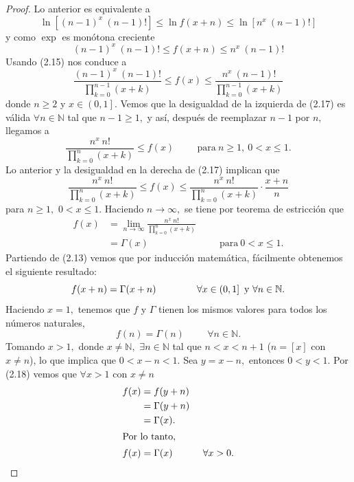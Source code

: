 \begin{proof}
	Lo anterior es equivalente a $$\ln \left[(n-1)^x\ (n-1)!\right] \leq \ln f(x+n) \leq \ln \left[n^x\ (n-1)!\right]$$ y como $\exp$ es monótona creciente $$(n-1)^x\ (n-1)! \leq f(x+n) \leq n^x\ (n-1)!$$
	Usando (2.15) nos conduce a
	\begin{equation}
	\frac{(n-1)^x\ (n-1)!}{\prod_{k = 0}^{n-1}(x+k)} \leq f(x) \leq \frac{n^x\ (n-1)!}{\prod_{k = 0}^{n-1}(x+k)}
	\end{equation}
	donde $n \geq 2$ y $x \in \left(0,1\right].$ Vemos que la desigualdad de la izquierda de (2.17) es válida $\forall n \in \mathbb{N}$ tal que $n-1 \geq 1,$ y así, después de reemplazar $n-1$ por $n,$ llegamos a $$\frac{n^x\ n!}{\prod_{k = 0}^{n}(x+k)} \leq f(x)\hspace{1cm}\textrm{para}\ n \geq 1,\ 0 < x \leq 1.$$
	Lo anterior y la desigualdad en la derecha de (2.17) implican que $$\frac{n^x\ n!}{\prod_{k = 0}^{n}(x+k)} \leq f(x) \leq \frac{n^x\ n!}{\prod_{k = 0}^{n}(x+k)}\cdot \frac{x+n}{n}$$ para $n \geq 1,$ $0 < x \leq 1.$ Haciendo $n \rightarrow \infty,$ se tiene por teorema de estricción que
	\begin{align*}
	f(x) &= \lim_{n \rightarrow \infty}\frac{n^x\ n!}{\prod_{k = 0}^{n}(x+k)}\\
	&= \Gamma(x)\hspace{3cm}\ \textrm{para}\ 0 < x \leq 1.
	\end{align*}
	Partiendo de (2.13) vemos que por inducción matemática, fácilmente obtenemos el siguiente resultado:
	\begin{equation}
	f(x+n) = \Gamma(x+n)\hspace{1.5cm}\forall x \in \left(0,1\right]\ \textrm{y}\ \forall n \in \mathbb{N}.
	\end{equation}
	Haciendo $x = 1,$ tenemos que $f$ y $\Gamma$ tienen los mismos valores para todos los números naturales, $$f(n) = \Gamma(n)\hspace{1cm}\forall n \in \mathbb{N}.$$
	Tomando $x > 1,$ donde $x \neq \mathbb{N},$ $\exists n \in \mathbb{N}$ tal que $n < x < n+1$ ($n = [x]$ con $x \neq n$), lo que implica que $0 < x-n < 1.$ Sea $y = x-n,$ entonces $0 < y < 1.$ Por (2.18) vemos que $\forall x > 1$ con $x \neq n$
	\begin{align*}
	f(x) &= f(y+n)\\
	&= \Gamma(y+n)\\
	&= \Gamma(x).\\
	\intertext{Por lo tanto,}
	f(x) &= \Gamma(x)\hspace{1cm}\ \forall x > 0.
	\end{align*}
\end{proof}

